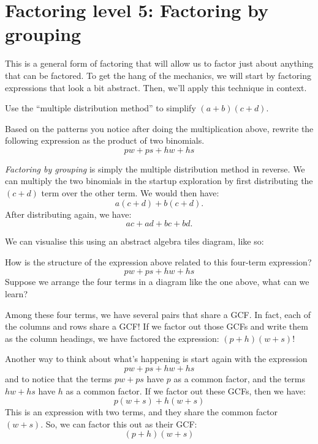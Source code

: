 \section{Factoring level 5: Factoring by grouping}

This is a general form of factoring that will allow us to factor just about anything that can be factored. To get the hang of the mechanics, we will start by factoring expressions that look a bit abstract. Then, we'll apply this technique in context.
 
\begin{boxexplore}
Use the ``multiple distribution method'' to simplify $(a+b)(c+d)$.

Based on the patterns you notice after doing the multiplication above, rewrite the following expression as the product of two binomials.
\[pw + ps + hw + hs\]
\end{boxexplore}

\textit{Factoring by grouping} is simply the multiple distribution method in reverse. We can multiply the two binomials in the startup exploration by first distributing the $(c+d)$ term over the other term. We would then have:
\[a (c + d) + b (c + d).\]
After distributing again, we have:
\[ac +ad + bc + bd.\]

We can visualise this using an abstract algebra tiles diagram, like so:

How is the structure of the expression above related to this four-term expression?
\[pw + ps + hw + hs\]
Suppose we arrange the four terms in a diagram like the one above, what can we learn?

Among these four terms, we have several pairs that share a GCF. In fact, each of the columns and rows share a GCF! If we factor out those GCFs and write them as the column headings, we have factored the expression: $(p+h)(w+s)$!

Another way to think about what's happening is start again with the expression
\[pw + ps + hw + hs\]
and to notice that the terms $pw + ps$ have $p$ as a common factor, and the terms $hw+hs$ have $h$ as a common factor. If we factor out these GCFs, then we have:
\[p(w+s) + h(w+s)\]
This is an expression with two terms, and they share the common factor $(w+s)$. So, we can factor this out as their GCF:
\[(p+h)(w+s)\]





